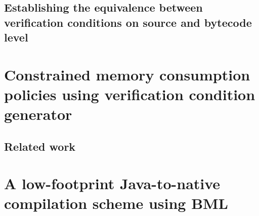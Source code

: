 \documentclass[book,10pt]{book}
\begin{document}
  
 \section{Establishing the equivalence between verification conditions on source and bytecode level} \label{pog:wpBcGeneral}
    
    
 
\chapter{Constrained memory consumption policies using verification condition generator}\label{applications:memory}
  
  \lstset{numbers=none}

  \label{sec:verif}
     
  
  
  
  \section{Related work}\label{sec:rel}
  

\chapter{A low-footprint Java-to-native compilation scheme using BML}\label{applications:optimComp}
  \lstset{frameround=tttt}
  
  
  
  
  
  
   
   
  
 
\end{document}
